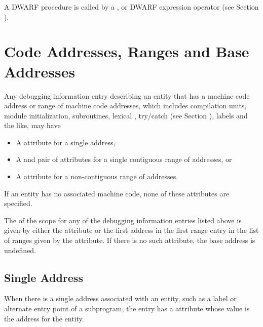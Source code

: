 A DWARF procedure is called by a \DWOPcalltwo, \DWOPcallfour{} 
or \DWOPcallref{} DWARF expression operator 
(see Section ).

\section{Code Addresses, Ranges and Base Addresses}
\label{chap:codeaddressesandranges}
Any debugging information entry describing an entity that has
a machine code address or range of machine code addresses,
which includes compilation units, module initialization,
subroutines, lexical , 
try/catch  (see Section ), 
labels and the like, may have
\begin{itemize}
\item \hypertarget{chap:DWATlowpccodeaddressorrangeofaddresses}{}
A \DWATlowpcDEFN{} attribute for a single address,

\item \hypertarget{chap:DWAThighpccontiguousrangeofcodeaddresses}{}
A \DWATlowpcDEFN{}
and \DWAThighpcDEFN{}
pair of attributes for a single contiguous range of
addresses, or

\item \hypertarget{chap:DWATrangesnoncontiguousrangeofcodeaddresses}{}
A \DWATrangesDEFN{} attribute
for a non-contiguous range of addresses.
\end{itemize}

If an entity has no associated machine code, 
none of these attributes are specified.

The  of the scope for any of the
debugging information entries listed above is given by either the 
\DWATlowpcNAME{} 
attribute or the first address in the first range entry 
in the list of ranges given by the \DWATrangesNAME{} attribute.
If there is no such attribute, the base address is undefined.

\subsection{Single Address}
\label{chap:singleaddress} 
When there is a single address associated with an entity,
such as a label or alternate entry point of a subprogram,
the entry has a \DWATlowpc{} attribute whose value is the
address for the entity.


